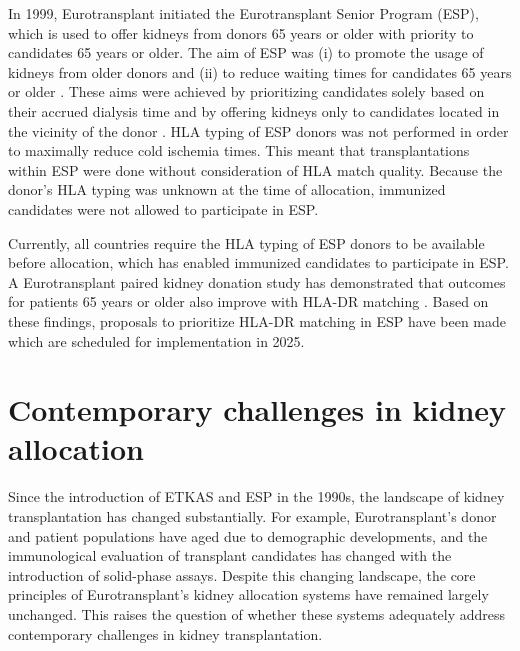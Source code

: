 \documentclass[11pt,twoside,]{book}
\begin{document}
In 1999, Eurotransplant initiated the Eurotransplant Senior Program (ESP), which
is used to offer kidneys from donors 65 years or older with priority to candidates
65 years or older. The aim of ESP was (i) to promote the usage of kidneys from
older donors and (ii) to reduce waiting times for candidates 65 years or older \citep{smitsEvaluationEurotransplantSenior2002}. These aims were achieved by
prioritizing candidates solely based on their accrued dialysis time and by offering kidneys
only to candidates located in the vicinity of the donor \citep{Frei2008}. HLA typing
of ESP donors was not performed in order to maximally reduce cold ischemia times.
This meant that transplantations within ESP were done
without consideration of HLA match quality. Because the donor's HLA typing was
unknown at the time of allocation, immunized candidates were not allowed
to participate in ESP.

Currently, all countries require the HLA typing of ESP donors to be available
before allocation, which has enabled immunized candidates to participate in
ESP. A Eurotransplant paired kidney donation study has demonstrated
that outcomes for patients 65 years or older also improve with HLA-DR matching \citep{deFijter2023}.
Based on these findings, proposals to prioritize HLA-DR matching in ESP have
been made which are scheduled for implementation in 2025.

\section{Contemporary challenges in kidney allocation}\label{contemporary-challenges-in-kidney-allocation}

Since the introduction of ETKAS and ESP in the 1990s, the landscape of kidney
transplantation has changed substantially. For example, Eurotransplant's donor and patient
populations have aged due to demographic developments, and the immunological
evaluation of transplant candidates has changed with the introduction of
solid-phase assays. Despite this changing landscape,
the core principles of Eurotransplant's kidney allocation systems have remained
largely unchanged. This raises the question of whether these systems adequately
address contemporary challenges in kidney transplantation.
\end{document}
